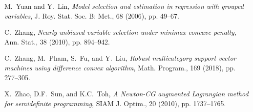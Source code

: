 \documentclass{siamart}
\begin{document}
\begin{thebibliography}{999}
{
{\sc M.\ Yuan and Y.\ Lin},
{\sl Model selection and estimation in regression with grouped variables},
 J. Roy. Stat. Soc. B: Met., 68 (2006), pp. 49--67.

{\sc C.\ Zhang},
{\sl Nearly unbiased variable selection under minimax concave penalty},
Ann. Stat., 38 (2010), pp. 894--942.

{\sc C.\ Zhang, M.\ Pham, S.\ Fu, and Y.\ Liu},
{\sl Robust multicategory support vector machines using difference convex algorithm},
Math. Program.,  169 (2018), pp. 277--305.

{\sc X.\ Zhao, D.F.\ Sun, and K.C.\ Toh},
{\sl A Newton-CG augmented Lagrangian method for semidefinite programming},
SIAM J. Optim., 20 (2010), pp. 1737--1765.

}
\end{thebibliography}
\end{document}
